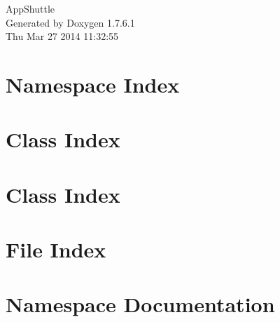 \documentclass[a4paper]{book}
\begin{document}
\hypersetup{pageanchor=false,citecolor=blue}
\begin{titlepage}
\vspace*{7cm}
\begin{center}
{\Large \-App\-Shuttle }\\
\vspace*{1cm}
{\large \-Generated by Doxygen 1.7.6.1}\\
\vspace*{0.5cm}
{\small Thu Mar 27 2014 11:32:55}\\
\end{center}
\end{titlepage}
\clearemptydoublepage
{}
\tableofcontents
\clearemptydoublepage
{}
\hypersetup{pageanchor=true,citecolor=blue}
\chapter{\-Namespace \-Index}

\chapter{\-Class \-Index}

\chapter{\-Class \-Index}

\chapter{\-File \-Index}

\chapter{\-Namespace \-Documentation}
















\end{document}
